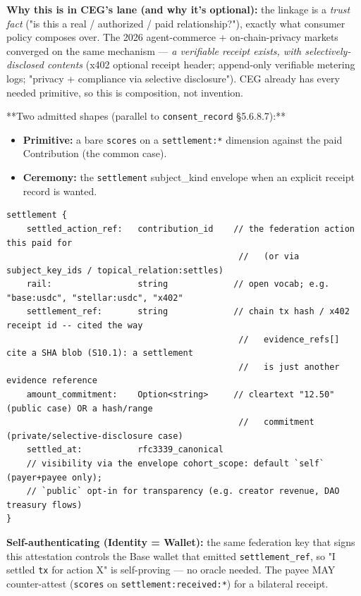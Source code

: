 \documentclass[11pt]{article}
\begin{document}
\textbf{Why this is in CEG's lane (and why it's optional):} the linkage is a \textit{trust fact} ("is this a real / authorized / paid relationship?"), exactly what consumer policy composes over. The 2026 agent-commerce + on-chain-privacy markets converged on the same mechanism — \textit{a verifiable receipt exists, with selectively-disclosed contents} (x402 optional receipt header; append-only verifiable metering logs; "privacy + compliance via selective disclosure"). CEG already has every needed primitive, so this is composition, not invention.


**Two admitted shapes (parallel to \texttt{consent\_record} §5.6.8.7):**

\begin{itemize}\setlength\itemsep{0pt}
\item \textbf{Primitive:} a bare \texttt{scores} on a \texttt{settlement:*} dimension against the paid Contribution (the common case).
\item \textbf{Ceremony:} the \texttt{settlement} subject\_kind envelope when an explicit receipt record is wanted.
\end{itemize}


\begin{lstlisting}
settlement {
    settled_action_ref:   contribution_id    // the federation action this paid for
                                              //   (or via subject_key_ids / topical_relation:settles)
    rail:                 string             // open vocab; e.g. "base:usdc", "stellar:usdc", "x402"
    settlement_ref:       string             // chain tx hash / x402 receipt id -- cited the way
                                              //   evidence_refs[] cite a SHA blob (S10.1): a settlement
                                              //   is just another evidence reference
    amount_commitment:    Option<string>     // cleartext "12.50" (public case) OR a hash/range
                                              //   commitment (private/selective-disclosure case)
    settled_at:           rfc3339_canonical
    // visibility via the envelope cohort_scope: default `self` (payer+payee only);
    // `public` opt-in for transparency (e.g. creator revenue, DAO treasury flows)
}
\end{lstlisting}

\textbf{Self-authenticating (Identity = Wallet):} the same federation key that signs this attestation controls the Base wallet that emitted \texttt{settlement\_ref}, so "I settled \texttt{tx} for action X" is self-proving — no oracle needed. The payee MAY counter-attest (\texttt{scores} on \texttt{settlement:received:*}) for a bilateral receipt.
\end{document}
